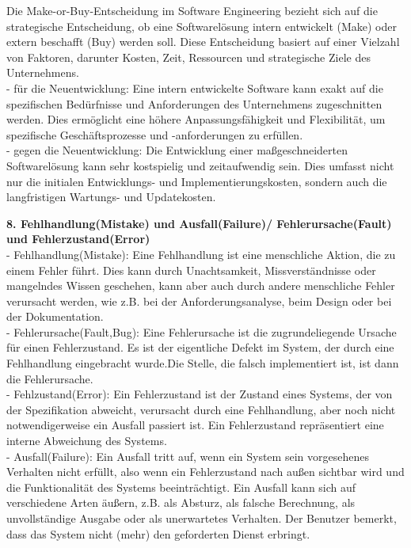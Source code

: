 \documentclass{article}
\begin{document}
Die Make-or-Buy-Entscheidung im Software Engineering bezieht sich auf die strategische Entscheidung, ob eine Softwarelösung intern entwickelt (Make) oder extern beschafft (Buy) werden soll. Diese Entscheidung basiert auf einer Vielzahl von Faktoren, darunter Kosten, Zeit, Ressourcen und strategische Ziele des Unternehmens.\\
- für die Neuentwicklung:  Eine intern entwickelte Software kann exakt auf die spezifischen Bedürfnisse und Anforderungen des Unternehmens zugeschnitten werden. Dies ermöglicht eine höhere Anpassungsfähigkeit und Flexibilität, um spezifische Geschäftsprozesse und -anforderungen zu erfüllen. \\
- gegen die Neuentwicklung: Die Entwicklung einer maßgeschneiderten Softwarelösung kann sehr kostspielig und zeitaufwendig sein. Dies umfasst nicht nur die initialen Entwicklungs- und Implementierungskosten, sondern auch die langfristigen Wartungs- und Updatekosten.
\newpage
{}
\textbf{8. Fehlhandlung(Mistake) und Ausfall(Failure)/ Fehlerursache(Fault) und Fehlerzustand(Error)}\\
- Fehlhandlung(Mistake): Eine Fehlhandlung ist eine menschliche Aktion, die zu einem Fehler führt. Dies kann durch Unachtsamkeit, Missverständnisse oder mangelndes Wissen geschehen, kann aber auch durch andere menschliche Fehler verursacht werden, wie z.B. bei der Anforderungsanalyse, beim Design oder bei der Dokumentation.\\
- Fehlerursache(Fault,Bug): Eine Fehlerursache ist die zugrundeliegende Ursache für einen Fehlerzustand. Es ist der eigentliche Defekt im System, der durch eine Fehlhandlung eingebracht wurde.Die Stelle, die falsch implementiert ist, ist dann die Fehlerursache.\\
- Fehlzustand(Error): Ein Fehlerzustand ist der Zustand eines Systems, der von der Spezifikation abweicht, verursacht durch eine Fehlhandlung, aber noch nicht notwendigerweise ein Ausfall passiert ist. Ein Fehlerzustand repräsentiert eine interne Abweichung des Systems.\\
- Ausfall(Failure):  Ein Ausfall tritt auf, wenn ein System sein vorgesehenes Verhalten nicht erfüllt, also wenn ein Fehlerzustand nach außen sichtbar wird und die Funktionalität des Systems beeinträchtigt. Ein Ausfall kann sich auf verschiedene Arten äußern, z.B. als Absturz, als falsche Berechnung, als unvollständige Ausgabe oder als unerwartetes Verhalten. Der Benutzer bemerkt, dass das System nicht (mehr) den geforderten Dienst erbringt.
\end{document}
